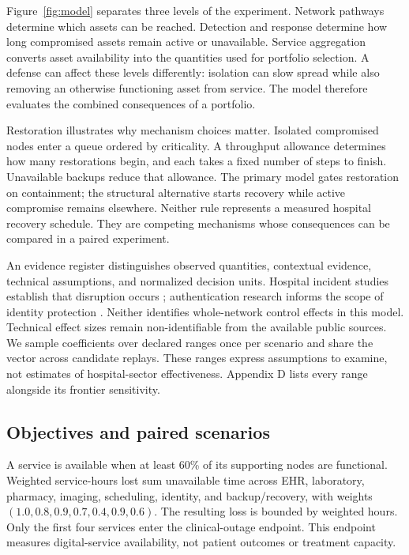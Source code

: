\documentclass[conference,compsoc]{IEEEtran}
\begin{document}
Figure~\ref{fig:model} separates three levels of the experiment. Network
pathways determine which assets can be reached. Detection and response
determine how long compromised assets remain active or unavailable. Service
aggregation converts asset availability into the quantities used for portfolio
selection. A defense can affect these levels differently: isolation can slow
spread while also removing an otherwise functioning asset from service.
The model therefore evaluates the combined consequences of a portfolio.

Restoration illustrates why mechanism choices matter. Isolated compromised
nodes enter a queue ordered by criticality. A throughput allowance determines
how many restorations begin, and each takes a fixed number of steps to finish.
Unavailable backups reduce that allowance. The primary model gates restoration
on containment; the structural alternative starts recovery while active
compromise remains elsewhere. Neither rule represents a measured hospital
recovery schedule. They are competing mechanisms whose consequences can be
compared in a paired experiment.

An evidence register distinguishes observed quantities, contextual evidence,
technical assumptions, and normalized decision units. Hospital incident
studies establish that disruption occurs \cite{neprash2022}; authentication
research informs the scope of identity protection \cite{meyer2023}.
Neither identifies whole-network control effects in this model. Technical
effect sizes remain non-identifiable from the available public sources.
We sample \SampledCoefficients{} coefficients over declared ranges once per
scenario and share the vector across candidate replays. These ranges express
assumptions to examine, not estimates of hospital-sector effectiveness.
Appendix D lists every range alongside its frontier sensitivity.

\subsection{Objectives and paired scenarios}
A service is available when at least 60\% of its supporting nodes are
functional. Weighted service-hours lost sum unavailable time across EHR,
laboratory, pharmacy, imaging, scheduling, identity, and backup/recovery,
with weights $(1.0,0.8,0.9,0.7,0.4,0.9,0.6)$. The resulting loss is bounded
by \JointLossBound{} weighted hours. Only the first four services enter the
clinical-outage endpoint. This endpoint measures digital-service availability,
not patient outcomes or treatment capacity.
\end{document}
